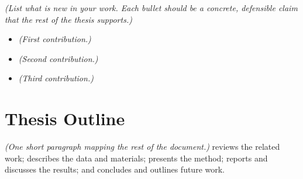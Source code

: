 \emph{(List what is new in your work. Each bullet should be a concrete,
defensible claim that the rest of the thesis supports.)}

\begin{itemize}[itemsep=0.3em]
  \item \emph{(First contribution.)}
  \item \emph{(Second contribution.)}
  \item \emph{(Third contribution.)}
\end{itemize}

\section{Thesis Outline}
\label{sec:outline}

\emph{(One short paragraph mapping the rest of the document.)}
 reviews the related work;  describes the data
and materials;  presents the method; 
reports and discusses the results; and  concludes and
outlines future work.
